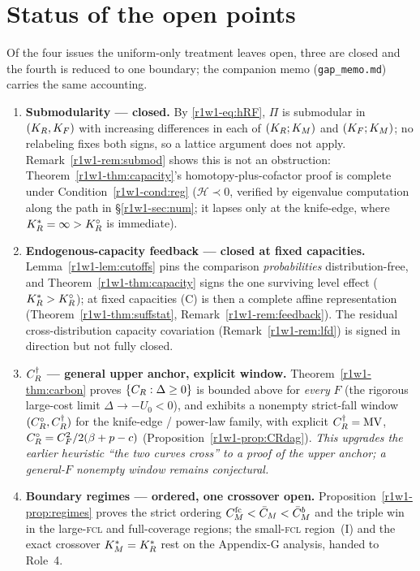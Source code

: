\section{Status of the open points}\label{r1w1-sec:gap}

Of the four issues the uniform-only treatment leaves open, three are closed and
the fourth is reduced to one boundary; the companion memo
(\texttt{gap\_memo.md}) carries the same accounting.
\begin{enumerate}[leftmargin=1.7em]
  \item \textbf{Submodularity --- closed.} By \eqref{r1w1-eq:hRF}, $\Pi$ is
        submodular in $(K_R,K_F)$ with increasing differences in each of
        $(K_R;K_M)$ and $(K_F;K_M)$; no relabeling fixes both signs, so a lattice
        argument does not apply. Remark~\ref{r1w1-rem:submod} shows this is not an
        obstruction: Theorem~\ref{r1w1-thm:capacity}'s homotopy-plus-cofactor proof is
        complete under Condition~\ref{r1w1-cond:reg} ($\mathcal H\prec0$, verified by
        eigenvalue computation along the path in \S\ref{r1w1-sec:num}; it lapses only at
        the knife-edge, where $K_R^{*}=\infty>K_R^{\circ}$ is immediate).
  \item \textbf{Endogenous-capacity feedback --- closed at fixed capacities.}
        Lemma~\ref{r1w1-lem:cutoffs} pins the comparison \emph{probabilities}
        distribution-free, and Theorem~\ref{r1w1-thm:capacity} signs the one surviving
        level effect ($K_R^{*}>K_R^{\circ}$); at fixed capacities (C) is then a complete
        affine representation (Theorem~\ref{r1w1-thm:suffstat}, Remark~\ref{r1w1-rem:feedback}).
        The residual cross-distribution capacity covariation (Remark~\ref{r1w1-rem:lfd})
        is signed in direction but not fully closed.
  \item \textbf{$C_R^{\dagger}$ --- general upper anchor, explicit window.}
        Theorem~\ref{r1w1-thm:carbon} proves $\{C_R:\Delta\ge0\}$ is bounded above for
        \emph{every} $F$ (the rigorous large-cost limit $\Delta\to-U_0<0$), and
        exhibits a nonempty strict-fall window $(C_R^{\circ},C_R^{\dagger})$ for the
        knife-edge / power-law family, with explicit
        $C_R^{\dagger}=\mathrm{MV}$, $C_R^{\circ}=C_F^2/2(\beta+p-c)$
        (Proposition~\ref{r1w1-prop:CRdag}). \emph{This upgrades the earlier heuristic
        ``the two curves cross'' to a proof of the upper anchor; a general-$F$
        nonempty window remains conjectural.}
  \item \textbf{Boundary regimes --- ordered, one crossover open.}
        Proposition~\ref{r1w1-prop:regimes} proves the strict ordering
        $C_M^{\mathrm{fc}}<\bar C_M<\bar C_M^{b}$ and the triple win in the large-\textsc{fcl}
        and full-coverage regions; the small-\textsc{fcl} region~(I) and the exact
        crossover $K_M^{*}=K_R^{*}$ rest on the Appendix-G analysis, handed to Role~4.
\end{enumerate}
